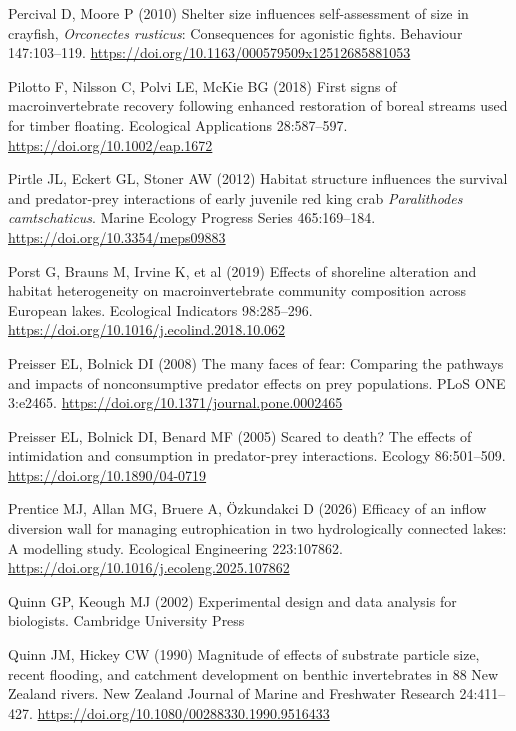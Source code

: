\documentclass[
  12pt,
  a4paper,
  oneside]{scrbook}
\newlength{\cslhangindent}
\newenvironment{CSLReferences}[2] %
 {\begin{list}{}{%
  \setlength{\itemindent}{0pt}
  \setlength{\leftmargin}{0pt}
  \setlength{\parsep}{0pt}
  \ifodd #1
   \setlength{\leftmargin}{\cslhangindent}
   \setlength{\itemindent}{-1\cslhangindent}
  \fi
  \setlength{\itemsep}{#2\baselineskip}}}
 {\end{list}}
\renewenvironment{CSLReferences}[2]
   {\begin{list}{}{%
    \setlength{\itemindent}{0pt}
    \setlength{\leftmargin}{0pt}
    \setlength{\parsep}{0pt}
    \ifodd #1
     \setlength{\leftmargin}{\cslhangindent}
     \setlength{\itemindent}{-1\cslhangindent}
    \fi
    \setlength{\itemsep}{0.3\baselineskip}}}
   {\end{list}}%
\begin{document}
\begin{CSLReferences}{1}{1}
Percival D, Moore P (2010) Shelter size influences self-assessment of
size in crayfish, {\emph{Orconectes rusticus}}: Consequences for
agonistic fights. Behaviour 147:103--119.
\url{https://doi.org/10.1163/000579509x12512685881053}

Pilotto F, Nilsson C, Polvi LE, McKie BG (2018) First signs of
macroinvertebrate recovery following enhanced restoration of boreal
streams used for timber floating. Ecological Applications 28:587--597.
\url{https://doi.org/10.1002/eap.1672}

Pirtle JL, Eckert GL, Stoner AW (2012) Habitat structure influences the
survival and predator-prey interactions of early juvenile red king crab
{\emph{Paralithodes camtschaticus}}. Marine Ecology Progress Series
465:169--184. \url{https://doi.org/10.3354/meps09883}

Porst G, Brauns M, Irvine K, et al (2019) Effects of shoreline
alteration and habitat heterogeneity on macroinvertebrate community
composition across {European} lakes. Ecological Indicators 98:285--296.
\url{https://doi.org/10.1016/j.ecolind.2018.10.062}

Preisser EL, Bolnick DI (2008) The many faces of fear: Comparing the
pathways and impacts of nonconsumptive predator effects on prey
populations. PLoS ONE 3:e2465.
\url{https://doi.org/10.1371/journal.pone.0002465}

Preisser EL, Bolnick DI, Benard MF (2005) Scared to death? The effects
of intimidation and consumption in predator-prey interactions. Ecology
86:501--509. \url{https://doi.org/10.1890/04-0719}

Prentice MJ, Allan MG, Bruere A, Özkundakci D (2026) Efficacy of an
inflow diversion wall for managing eutrophication in two hydrologically
connected lakes: A modelling study. Ecological Engineering 223:107862.
\url{https://doi.org/10.1016/j.ecoleng.2025.107862}

Quinn GP, Keough MJ (2002) Experimental design and data analysis for
biologists. Cambridge University Press

Quinn JM, Hickey CW (1990) Magnitude of effects of substrate particle
size, recent flooding, and catchment development on benthic
invertebrates in 88 {New Zealand} rivers. New Zealand Journal of Marine
and Freshwater Research 24:411--427.
\url{https://doi.org/10.1080/00288330.1990.9516433}


\end{CSLReferences}
\end{document}
